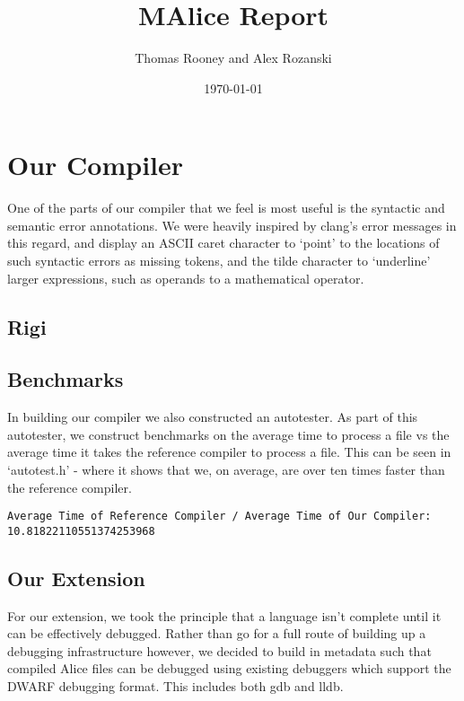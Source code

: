 \documentclass[a4wide, 11pt]{article}
\begin{document}
\title{MAlice Report}

\author{Thomas Rooney and Alex Rozanski}

\date{\today}

\maketitle

\section{Our Compiler}

One of the parts of our compiler that we feel is most useful is the syntactic and semantic error annotations. We were heavily inspired by clang's error messages in this regard, and display an ASCII caret character to `point' to the locations of such syntactic errors as missing tokens, and the tilde character to `underline' larger expressions, such as operands to a mathematical operator.

\subsection{Rigi}

\subsection{Benchmarks}

In building our compiler we also constructed an autotester. As part of this autotester, we construct benchmarks on the average time to process a file vs the average time it takes the reference compiler to process a file. This can be seen in `autotest.h' - where it shows that we, on average, are over ten times faster than the reference compiler.
\begin{verbatim}
Average Time of Reference Compiler / Average Time of Our Compiler: 10.81822110551374253968
\end{verbatim}

\subsection{Our Extension}

For our extension, we took the principle that a language isn't complete until it can be effectively debugged. Rather than go for a full route of building up a debugging infrastructure however, we decided to build in metadata such that compiled Alice files can be debugged using existing debuggers which support the DWARF debugging format. This includes both gdb and lldb.
\end{document}
